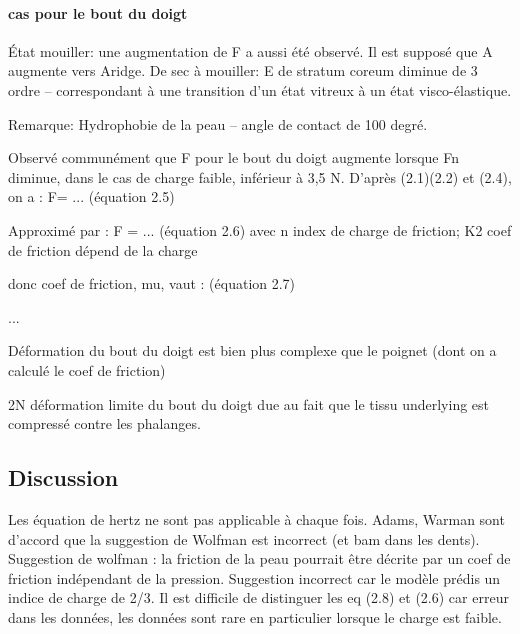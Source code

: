 \paragraph{cas pour le bout du doigt}
 
 État mouiller: une augmentation de F  a aussi été observé. Il est supposé que A augmente vers Aridge. 
 De sec à mouiller: E de stratum coreum diminue de 3 ordre -- correspondant à une transition d'un état vitreux à un état visco-élastique. 
 
Remarque: Hydrophobie de la peau -- angle de contact de 100 degré.

Observé communément que F pour le bout du doigt augmente lorsque Fn diminue, dans le cas de charge faible, inférieur à 3,5 N. D'après (2.1)(2.2) et (2.4), on a : 
F= ... (équation 2.5)

Approximé par :
F = ... (équation 2.6)
avec n index de charge de friction; K2 coef de friction dépend de la charge

donc coef de friction, mu, vaut :
(équation 2.7)

...


Déformation du bout du doigt est bien plus complexe que le poignet (dont on a calculé le coef de friction)
 
2N déformation limite du bout du doigt due au fait que le tissu underlying est compressé contre les phalanges.

\subsection{Discussion}

Les équation de hertz ne sont pas applicable à chaque fois. Adams, Warman sont d'accord que la suggestion de Wolfman est incorrect (et bam dans les dents). Suggestion de wolfman : la friction de la peau pourrait être décrite par un coef de friction indépendant de la pression. Suggestion incorrect car le modèle prédis un indice de charge de 2/3.
Il est difficile de distinguer les eq (2.8) et (2.6) car erreur dans les données, les données sont rare en particulier lorsque le charge est faible. 

